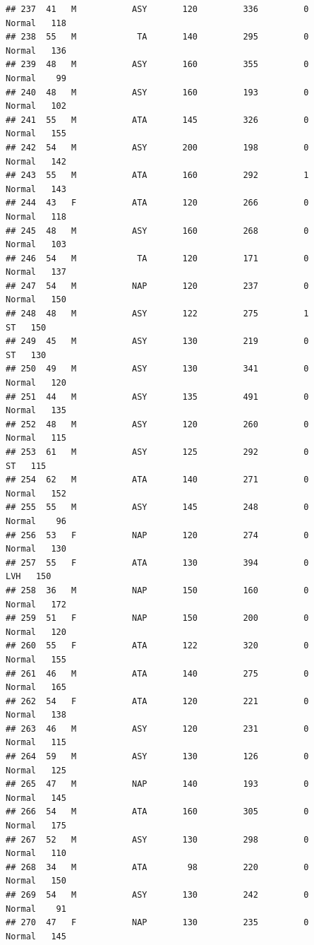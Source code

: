 \documentclass[
]{article}
\begin{document}
\begin{verbatim}
## 237  41   M           ASY       120         336         0     Normal   118
## 238  55   M            TA       140         295         0     Normal   136
## 239  48   M           ASY       160         355         0     Normal    99
## 240  48   M           ASY       160         193         0     Normal   102
## 241  55   M           ATA       145         326         0     Normal   155
## 242  54   M           ASY       200         198         0     Normal   142
## 243  55   M           ATA       160         292         1     Normal   143
## 244  43   F           ATA       120         266         0     Normal   118
## 245  48   M           ASY       160         268         0     Normal   103
## 246  54   M            TA       120         171         0     Normal   137
## 247  54   M           NAP       120         237         0     Normal   150
## 248  48   M           ASY       122         275         1         ST   150
## 249  45   M           ASY       130         219         0         ST   130
## 250  49   M           ASY       130         341         0     Normal   120
## 251  44   M           ASY       135         491         0     Normal   135
## 252  48   M           ASY       120         260         0     Normal   115
## 253  61   M           ASY       125         292         0         ST   115
## 254  62   M           ATA       140         271         0     Normal   152
## 255  55   M           ASY       145         248         0     Normal    96
## 256  53   F           NAP       120         274         0     Normal   130
## 257  55   F           ATA       130         394         0        LVH   150
## 258  36   M           NAP       150         160         0     Normal   172
## 259  51   F           NAP       150         200         0     Normal   120
## 260  55   F           ATA       122         320         0     Normal   155
## 261  46   M           ATA       140         275         0     Normal   165
## 262  54   F           ATA       120         221         0     Normal   138
## 263  46   M           ASY       120         231         0     Normal   115
## 264  59   M           ASY       130         126         0     Normal   125
## 265  47   M           NAP       140         193         0     Normal   145
## 266  54   M           ATA       160         305         0     Normal   175
## 267  52   M           ASY       130         298         0     Normal   110
## 268  34   M           ATA        98         220         0     Normal   150
## 269  54   M           ASY       130         242         0     Normal    91
## 270  47   F           NAP       130         235         0     Normal   145

\end{verbatim}
\end{document}
